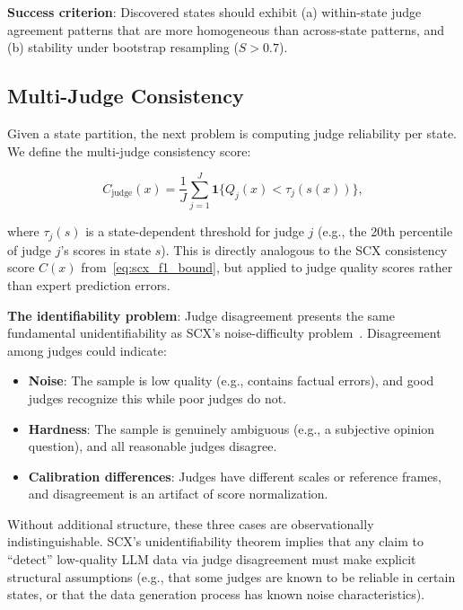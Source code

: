 \documentclass[11pt,twocolumn]{article}
\begin{document}
\textbf{Success criterion}: Discovered states should exhibit (a) within-state judge agreement patterns that are more homogeneous than across-state patterns, and (b) stability under bootstrap resampling ($S > 0.7$).

\subsection{Multi-Judge Consistency}
\label{sec:multi_judge}

Given a state partition, the next problem is computing judge reliability per state. We define the multi-judge consistency score:

\begin{equation}
C_{\text{judge}}(x) = \frac{1}{J} \sum_{j=1}^J \mathbf{1}\{Q_j(x) < \tau_j(s(x))\},
\label{eq:multi_judge_consistency}
\end{equation}

where $\tau_j(s)$ is a state-dependent threshold for judge $j$ (e.g., the 20th percentile of judge $j$'s scores in state $s$). This is directly analogous to the SCX consistency score $C(x)$ from~\eqref{eq:scx_f1_bound}, but applied to judge quality scores rather than expert prediction errors.

\textbf{The identifiability problem}: Judge disagreement presents the same fundamental unidentifiability as SCX's noise-difficulty problem~\cite{scx2026}. Disagreement among judges could indicate:
\begin{itemize}
    \item \textbf{Noise}: The sample is low quality (e.g., contains factual errors), and good judges recognize this while poor judges do not.
    \item \textbf{Hardness}: The sample is genuinely ambiguous (e.g., a subjective opinion question), and all reasonable judges disagree.
    \item \textbf{Calibration differences}: Judges have different scales or reference frames, and disagreement is an artifact of score normalization.
\end{itemize}

Without additional structure, these three cases are observationally indistinguishable. SCX's unidentifiability theorem implies that any claim to ``detect'' low-quality LLM data via judge disagreement must make explicit structural assumptions (e.g., that some judges are known to be reliable in certain states, or that the data generation process has known noise characteristics).
\end{document}
